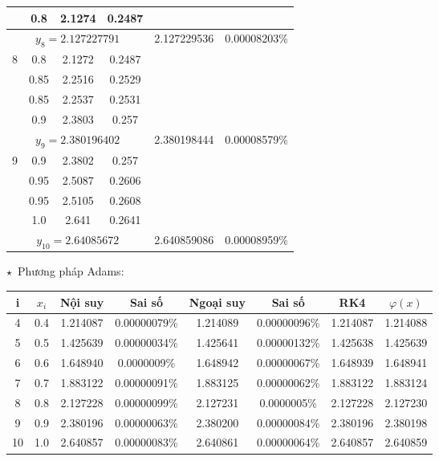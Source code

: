 \begin{longtable}{|c|c|c|c|c|c|}
	                   & 0.8   & 2.1274 & 0.2487         &                &          \\ \hline
	\multicolumn{4}{|c|}{$y_8 = 2.127227791$}            & 2.127229536    & 0.00008203\% \\ \hline
	\multirow{4}{*}{8} & 0.8   & 2.1272 & 0.2487         &                &          \\ \cline{2-4}
	                   & 0.85  & 2.2516 & 0.2529         &                &          \\ \cline{2-4}
	                   & 0.85  & 2.2537 & 0.2531         &                &          \\ \cline{2-4}
	                   & 0.9   & 2.3803 & 0.257          &                &          \\ \hline
	\multicolumn{4}{|c|}{$y_9 = 2.380196402$}            & 2.380198444    & 0.00008579\% \\ \hline
	\multirow{4}{*}{9} & 0.9   & 2.3802 & 0.257          &                &          \\ \cline{2-4}
	                   & 0.95  & 2.5087 & 0.2606         &                &          \\ \cline{2-4}
	                   & 0.95  & 2.5105 & 0.2608         &                &          \\ \cline{2-4}
	                   & 1.0   & 2.641  & 0.2641         &                &          \\ \hline
	\multicolumn{4}{|c|}{$y_10 = 2.64085672$}            & 2.640859086    & 0.00008959\% \\ \hline
\end{longtable}

$\star$~Phương pháp Adams:
\begin{longtable}{|c|c|c|c|c|c|c|c|}\hline
	i  & $x_i$ & Nội suy   & Sai số       & Ngoại suy   & Sai số       & RK4      & $\varphi(x)$ \\ \hline
	\endhead
	4  & 0.4   & 1.214087  & 0.00000079\% & 1.214089    & 0.00000096\% & 1.214087 & 1.214088     \\ \hline
	5  & 0.5   & 1.425639  & 0.00000034\% & 1.425641    & 0.00000132\% & 1.425638 & 1.425639     \\ \hline
	6  & 0.6   & 1.648940  & 0.0000009\%  & 1.648942    & 0.00000067\% & 1.648939 & 1.648941     \\ \hline
	7  & 0.7   & 1.883122  & 0.00000091\% & 1.883125    & 0.00000062\% & 1.883122 & 1.883124     \\ \hline
	8  & 0.8   & 2.127228  & 0.00000099\% & 2.127231    & 0.0000005\%  & 2.127228 & 2.127230     \\ \hline
	9  & 0.9   & 2.380196  & 0.00000063\% & 2.380200    & 0.00000084\% & 2.380196 & 2.380198     \\ \hline
	10 & 1.0   & 2.640857  & 0.00000083\% & 2.640861    & 0.00000064\% & 2.640857 & 2.640859     \\ \hline
\end{longtable}

